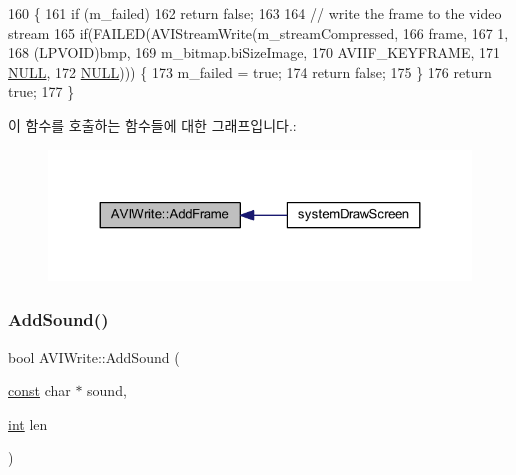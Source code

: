 \begin{DoxyCode}
160 \{
161   \textcolor{keywordflow}{if} (m\_failed)
162     \textcolor{keywordflow}{return} \textcolor{keyword}{false};
163   
164   \textcolor{comment}{// write the frame to the video stream}
165   \textcolor{keywordflow}{if}(FAILED(AVIStreamWrite(m\_streamCompressed,
166                            frame,
167                            1,
168                            (LPVOID)bmp,
169                            m\_bitmap.biSizeImage,
170                            AVIIF\_KEYFRAME,
171                            \mbox{\hyperlink{getopt1_8c_a070d2ce7b6bb7e5c05602aa8c308d0c4}{NULL}},
172                            \mbox{\hyperlink{getopt1_8c_a070d2ce7b6bb7e5c05602aa8c308d0c4}{NULL}}))) \{
173     m\_failed = \textcolor{keyword}{true};
174     \textcolor{keywordflow}{return} \textcolor{keyword}{false};
175   \}
176   \textcolor{keywordflow}{return} \textcolor{keyword}{true};
177 \}
\end{DoxyCode}
이 함수를 호출하는 함수들에 대한 그래프입니다.\+:
\nopagebreak
\begin{figure}[H]
\begin{center}
\leavevmode
\includegraphics[width=324pt]{class_a_v_i_write_a904b7f02ff6ecfeeaeec6e1c82f1592a_icgraph}
\end{center}
\end{figure}
\mbox{\label{class_a_v_i_write_a63b7d54c048e517bbfad0ae2004d9861}} 
\subsubsection{\texorpdfstring{Add\+Sound()}{AddSound()}}
{\footnotesize\ttfamily bool A\+V\+I\+Write\+::\+Add\+Sound (\begin{DoxyParamCaption}\item[{\mbox{\hyperlink{getopt1_8c_a2c212835823e3c54a8ab6d95c652660e}{const}} char $\ast$}]{sound,  }\item[{\mbox{\hyperlink{_util_8cpp_a0ef32aa8672df19503a49fab2d0c8071}{int}}}]{len }\end{DoxyParamCaption})}



